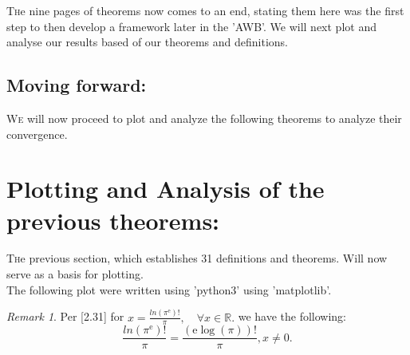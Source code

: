 \documentclass[10pt]{article}
\theoremstyle{plain}
\theoremstyle{definition}
\theoremstyle{remark}
\newtheorem{remark}[theorem]{Remark}
\begin{document}
\lettrine[lines=2, lhang=0.1, loversize=0.2]{T}he nine pages of theorems now comes to an end, stating them here was the first step to then develop a framework later in the 'AWB'. We will next plot and analyse our results based of our theorems and definitions.

\subsection{Moving forward:}
\lettrine[lines=2, lhang=0.1, loversize=0.2]{W}e will now proceed to plot and analyze the following theorems to analyze their convergence.

\section{Plotting and Analysis of the previous theorems:}
\lettrine[lines=2, lhang=0.1, loversize=0.2]{T}he previous section, which establishes 31 definitions and theorems. Will now serve as a basis for plotting.\\
The following plot were written using 'python3' using 'matplotlib'.

\begin{remark}
	Per [2.31] for $x = \frac{ln(\pi^\mathrm{e})!}{\pi}, \quad \forall x \in \mathbb{R}.$ we have the following:
	\begin{equation}
		\frac{ln(\pi^\mathrm{e})!}{\pi} = \frac{(\mathrm{e} \log(\pi))!}{\pi}, x \neq 0.
	\end{equation}
\end{remark}

\nocite{*}



\end{document}

